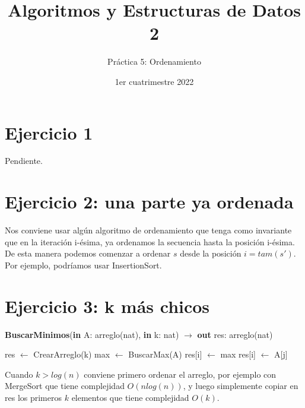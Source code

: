 

\title{Algoritmos y Estructuras de Datos 2}
\author{Práctica 5: Ordenamiento}
\date{1er cuatrimestre 2022}



\maketitle
\tableofcontents
\newpage

\section{Ejercicio 1}

Pendiente.

\section{Ejercicio 2: una parte ya ordenada}

Nos conviene usar algún algoritmo de ordenamiento que tenga como invariante que en la iteración i-ésima, ya ordenamos la secuencia hasta la posición i-ésima. De esta manera podemos comenzar a ordenar $s$ desde la posición $i=tam(s')$. Por ejemplo, podríamos usar InsertionSort.

\section{Ejercicio 3: k más chicos}

\begin{algorithm}[H]
\caption{
    \textbf{BuscarMinimos}(\textbf{in} A: arreglo(nat), \textbf{in} k: nat) $\to$ \textbf{out} res: arreglo(nat)
}
\begin{algorithmic}[1]
    \State res $\gets$ CrearArreglo(k) 
    \State max $\gets$ BuscarMax(A) 
     
        \State res[i] $\gets$ max
    \EndFor
     
         
                \State res[i] $\gets$ A[j]
            \EndIf
        \EndFor
    \EndFor
\end{algorithmic}
\end{algorithm}

Cuando $k > log(n)$ conviene primero ordenar el arreglo, por ejemplo con MergeSort que tiene complejidad $O(n log(n))$, y luego simplemente copiar en res los primeros $k$ elementos que tiene complejidad $O(k)$.


